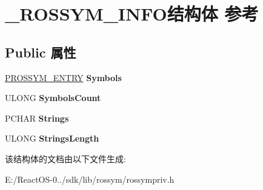 \hypertarget{struct___r_o_s_s_y_m___i_n_f_o}{}\section{\+\_\+\+R\+O\+S\+S\+Y\+M\+\_\+\+I\+N\+F\+O结构体 参考}
\label{struct___r_o_s_s_y_m___i_n_f_o}
\subsection*{Public 属性}
\begin{DoxyCompactItemize}
\item 
\mbox{\label{struct___r_o_s_s_y_m___i_n_f_o_aa7570a4f10c8a3efad843fe7fc0d1161}} 
\hyperlink{struct___r_o_s_s_y_m___e_n_t_r_y}{P\+R\+O\+S\+S\+Y\+M\+\_\+\+E\+N\+T\+RY} {\bfseries Symbols}
\item 
\mbox{\label{struct___r_o_s_s_y_m___i_n_f_o_a153b9fa9e39ac9507678dc0ec457a89d}} 
U\+L\+O\+NG {\bfseries Symbols\+Count}
\item 
\mbox{\label{struct___r_o_s_s_y_m___i_n_f_o_aac7398bb135e10889682fd96f408d4f8}} 
P\+C\+H\+AR {\bfseries Strings}
\item 
\mbox{\label{struct___r_o_s_s_y_m___i_n_f_o_a8b8622ad06567dd8c7c944ac3fd629fa}} 
U\+L\+O\+NG {\bfseries Strings\+Length}
\end{DoxyCompactItemize}


该结构体的文档由以下文件生成\+:\begin{DoxyCompactItemize}
\item 
E\+:/\+React\+O\+S-\/0../sdk/lib/rossym/rossympriv.\+h\end{DoxyCompactItemize}
